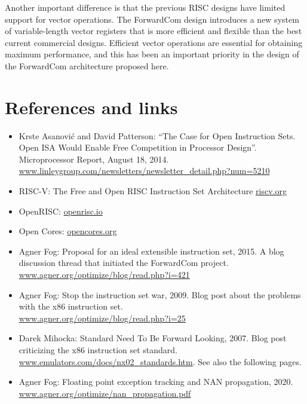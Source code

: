 \documentclass[forwardcom.tex]{subfiles}
\begin{document}
Another important difference is that the previous RISC designs have limited support for vector operations. The ForwardCom design introduces a new system of variable-length vector registers that is more efficient and flexible than the best current commercial designs. Efficient vector operations are essential for obtaining maximum performance, and this has been an important priority in the design of the ForwardCom architecture proposed here.

\section{References and links} \label{referencesToIntroduction}

\begin{itemize}
\item
Krste Asanovi\'{c} and David Patterson: ``The Case for Open Instruction Sets. Open ISA Would Enable Free 
Competition in Processor Design''. Microprocessor Report, August 18, 2014. \\
\href{https://www.linleygroup.com/newsletters/newsletter_detail.php?num=5210}{www.linleygroup.com/newsletters/newsletter\_detail.php?num=5210}

\item
RISC-V: The Free and Open RISC Instruction Set Architecture
\href{https://riscv.org}{riscv.org}

\item
OpenRISC: 
\href{https://openrisc.io}{openrisc.io}

\item
Open Cores: 
\href{https://opencores.org}{opencores.org}

\item
Agner Fog: Proposal for an ideal extensible instruction set, 2015. A blog discussion thread that initiated the ForwardCom project. \\
\href{https://www.agner.org/optimize/blog/read.php?i=421}{www.agner.org/optimize/blog/read.php?i=421}

\item
Agner Fog: Stop the instruction set war, 2009. Blog post about the problems with the x86 instruction set. \\
\href{https://www.agner.org/optimize/blog/read.php?i=25}{www.agner.org/optimize/blog/read.php?i=25}

\item
Darek Mihocka: Standard Need To Be Forward Looking, 2007. Blog post criticizing the x86 instruction set standard. \\
\href{http://www.emulators.com/docs/nx02_standards.htm}{www.emulators.com/docs/nx02\_standards.htm}. See also the following pages.

\item
Agner Fog: Floating point exception tracking and NAN propagation, 2020. 
\href{https://www.agner.org/optimize/nan_propagation.pdf}{www.agner.org/optimize/nan\_propagation.pdf}


\end{itemize}
\end{document}
